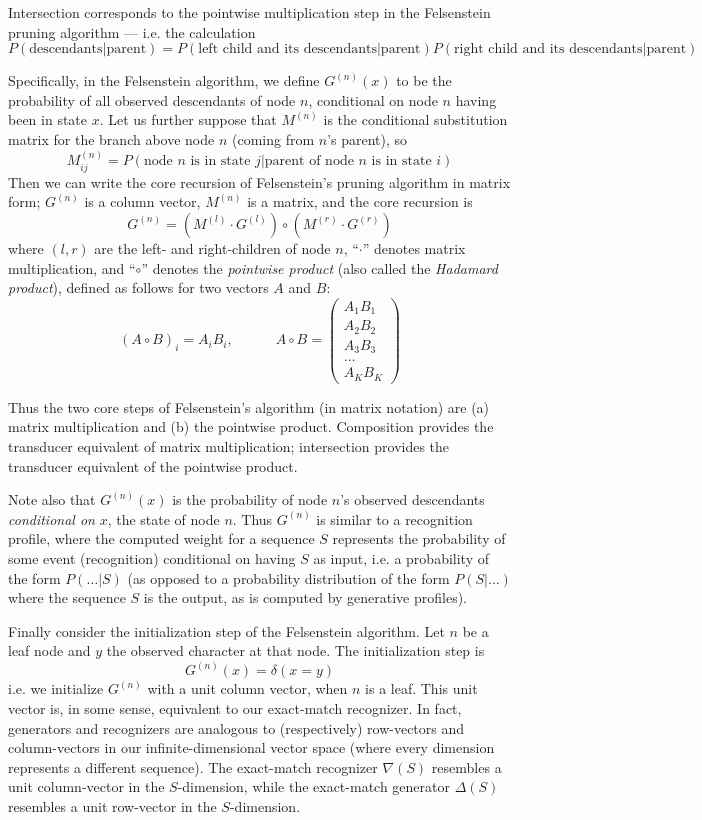 \documentclass{article}
\newcommand\fork{\circ}
\newcommand\generate{\Delta}
\newcommand\recognize{\nabla}
\begin{document}
Intersection corresponds to the pointwise multiplication step in the Felsenstein pruning algorithm ---
i.e. the calculation
\[
P(\mbox{descendants}|\mbox{parent}) =
P(\mbox{left child and its descendants}|\mbox{parent})
P(\mbox{right child and its descendants}|\mbox{parent})
\]

Specifically, in the Felsenstein algorithm,
we define $G^{(n)}(x)$ to be the probability of all observed descendants of node $n$,
conditional on node $n$ having been in state $x$.
Let us further suppose that $M^{(n)}$ is the conditional substitution matrix
for the branch above node $n$ (coming from $n$'s parent), so
\[
M^{(n)}_{ij}=P(\mbox{node $n$ is in state $j$}|\mbox{parent of node $n$ is in state $i$})
\]
Then we can write the core recursion of Felsenstein's pruning algorithm in matrix form;
$G^{(n)}$ is a column vector, $M^{(n)}$ is a matrix, and the core recursion is
\[
G^{(n)} = \left( M^{(l)} \cdot G^{(l)} \right) \fork \left( M^{(r)} \cdot G^{(r)} \right)
\]
where $(l,r)$ are the left- and right-children of node $n$,
``$\cdot$'' denotes matrix multiplication,
and ``$\fork$'' denotes the {\em pointwise product} (also called the {\em Hadamard product}),
defined as follows for two vectors $A$ and $B$:
\[
(A \fork B)_i = A_i B_i,
\quad \quad \quad
A \fork B = \left( \begin{array}{c}
A_1 B_1 \\ A_2 B_2 \\ A_3 B_3 \\ \ldots \\ A_K B_K
\end{array} \right)
\]

Thus the two core steps of Felsenstein's algorithm (in matrix notation)
are (a) matrix multiplication and (b) the pointwise product.
Composition provides the transducer equivalent of matrix multiplication;
intersection provides the transducer equivalent of the pointwise product.

Note also that $G^{(n)}(x)$ is the probability of node $n$'s observed descendants
{\em conditional on} $x$, the state of node $n$.
Thus $G^{(n)}$ is similar to a recognition profile,
where the computed weight for a sequence $S$ represents
the probability of some event (recognition) conditional on having $S$ as input,
i.e. a probability of the form $P(\ldots|S)$
(as opposed to a probability distribution of the form $P(S|\ldots)$ where the sequence $S$ is the output,
as is computed by generative profiles).

Finally consider the initialization step of the Felsenstein algorithm.
Let $n$ be a leaf node and $y$ the observed character at that node.
The initialization step is
\[
G^{(n)}(x) = \delta(x=y)
\]
i.e. we initialize $G^{(n)}$ with a unit column vector, when $n$ is a leaf.
This unit vector is, in some sense, equivalent to our exact-match recognizer.
In fact, generators and recognizers are analogous to (respectively) row-vectors and column-vectors
in our infinite-dimensional vector space (where every dimension represents a different sequence).
The exact-match recognizer $\recognize(S)$ resembles a unit column-vector in the $S$-dimension,
while the exact-match generator $\generate(S)$ resembles a unit row-vector in the $S$-dimension.
\end{document}
